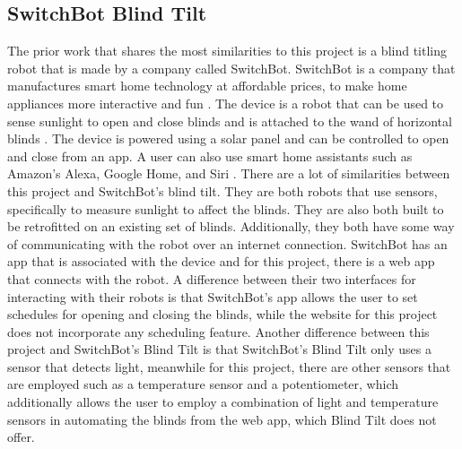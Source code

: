 \documentclass[10pt,twocolumn]{article}
\begin{document}
\subsection{SwitchBot Blind Tilt}
The prior work that shares the most similarities to this project is a blind titling robot that is made by a company called SwitchBot. SwitchBot is a company that manufactures smart home technology at affordable prices, to make home appliances more interactive and fun \cite{SwitchBot2022}. The device is a robot that can be used to sense sunlight to open and close blinds and is attached to the wand of horizontal blinds \cite{WonderTechLab2022SwitchBot}. The device is powered using a solar panel and can be controlled to open and close from an app. A user can also use smart home assistants such as Amazon’s Alexa, Google Home, and Siri \cite{WonderTechLab2022SwitchBot}. There are a lot of similarities between this project and SwitchBot’s blind tilt. They are both robots that use sensors, specifically to measure sunlight to affect the blinds. They are also both built to be retrofitted on an existing set of blinds. Additionally, they both have some way of communicating with the robot over an internet connection. SwitchBot has an app that is associated with the device and for this project, there is a web app that connects with the robot. A difference between their two interfaces for interacting with their robots is that SwitchBot’s app allows the user to set schedules for opening and closing the blinds, while the website for this project does not incorporate any scheduling feature. Another difference between this project and SwitchBot’s Blind Tilt is that SwitchBot’s Blind Tilt only uses a sensor that detects light, meanwhile for this project, there are other sensors that are employed such as a temperature sensor and a potentiometer, which additionally allows the user to employ a combination of light and temperature sensors in automating the blinds from the web app, which Blind Tilt does not offer. 
\end{document}
